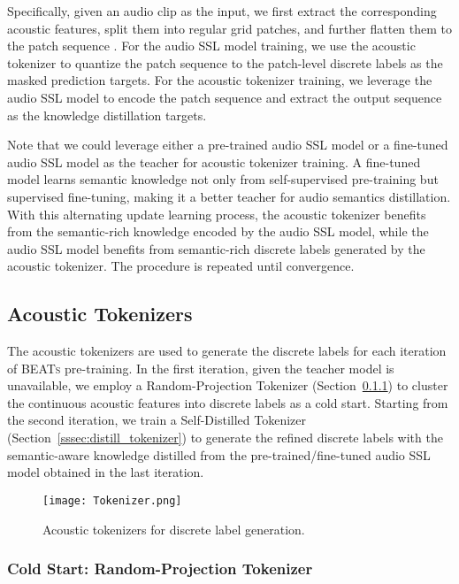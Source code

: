 \documentclass{article}
\theoremstyle{plain}
\theoremstyle{definition}
\theoremstyle{remark}
\newcommand\our{\textsc{BEATs}}
\begin{document}
Specifically, given an audio clip as the input, we first extract the corresponding acoustic features, split them into regular grid patches, and further flatten them to the patch sequence . 
For the audio SSL model training, we use the acoustic tokenizer to quantize the patch sequence  to the patch-level discrete labels  as the masked prediction targets.
For the acoustic tokenizer training, we leverage the audio SSL model to encode the patch sequence  and extract the output sequence   as the knowledge distillation targets.
 
Note that we could leverage either a pre-trained audio SSL model or a fine-tuned audio SSL model as the teacher for acoustic tokenizer training.
A fine-tuned model learns semantic knowledge not only from self-supervised pre-training but supervised fine-tuning, making it a better teacher for audio semantics distillation.
With this alternating update learning process, the acoustic tokenizer benefits from the semantic-rich knowledge encoded by the audio SSL model, while the audio SSL model benefits from semantic-rich discrete labels generated by the acoustic tokenizer.
The procedure is repeated until convergence. 

\subsection{Acoustic Tokenizers}
\label{ssec:tokenizer}
The acoustic tokenizers are used to generate the discrete labels for each iteration of \our{} pre-training.
In the first iteration, given the teacher model is unavailable, we employ a Random-Projection Tokenizer (Section~\ref{sssec:random_tokenizer}) to cluster the continuous acoustic features into discrete labels as a cold start.
Starting from the second iteration, we train a Self-Distilled Tokenizer (Section~\ref{sssec:distill_tokenizer}) to generate the refined discrete labels with the semantic-aware knowledge distilled from the pre-trained/fine-tuned audio SSL model obtained in the last iteration. 
\begin{figure*}[t]
	\centering
	\texttt{[image: Tokenizer.png]}
	\caption{Acoustic tokenizers for discrete label generation.}\label{tokenizer}
\end{figure*}

\subsubsection{Cold Start: Random-Projection Tokenizer}
\label{sssec:random_tokenizer}
\end{document}
